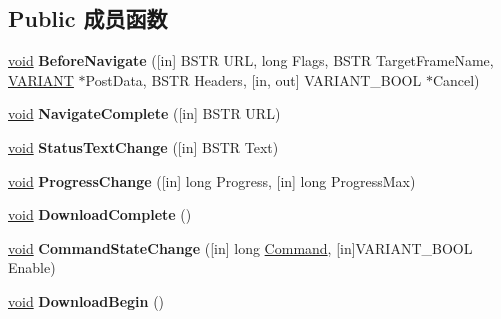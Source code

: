 \subsection*{Public 成员函数}
\begin{DoxyCompactItemize}
\item 
\mbox{\label{interface_s_h_doc_vw_1_1uuid_a81933cddb64bffcead5b3bffbcf7a5f6}} 
\hyperlink{interfacevoid}{void} {\bfseries Before\+Navigate} (\mbox{[}in\mbox{]} B\+S\+TR U\+RL, long Flags, B\+S\+TR Target\+Frame\+Name, \hyperlink{structtag_v_a_r_i_a_n_t}{V\+A\+R\+I\+A\+NT} $\ast$Post\+Data, B\+S\+TR Headers, \mbox{[}in, out\mbox{]} V\+A\+R\+I\+A\+N\+T\+\_\+\+B\+O\+OL $\ast$Cancel)
\item 
\mbox{\label{interface_s_h_doc_vw_1_1uuid_a240089bb39c9bac689dd4fed378fa785}} 
\hyperlink{interfacevoid}{void} {\bfseries Navigate\+Complete} (\mbox{[}in\mbox{]} B\+S\+TR U\+RL)
\item 
\mbox{\label{interface_s_h_doc_vw_1_1uuid_a576a847c0ad64a05dbabb6d517f5ecee}} 
\hyperlink{interfacevoid}{void} {\bfseries Status\+Text\+Change} (\mbox{[}in\mbox{]} B\+S\+TR Text)
\item 
\mbox{\label{interface_s_h_doc_vw_1_1uuid_ad0a4046c6922c56b1b726e301d474086}} 
\hyperlink{interfacevoid}{void} {\bfseries Progress\+Change} (\mbox{[}in\mbox{]} long Progress, \mbox{[}in\mbox{]} long Progress\+Max)
\item 
\mbox{\label{interface_s_h_doc_vw_1_1uuid_a0815fd0342635c884b6adf3c3af778ac}} 
\hyperlink{interfacevoid}{void} {\bfseries Download\+Complete} ()
\item 
\mbox{\label{interface_s_h_doc_vw_1_1uuid_adc74e6a1d4edcdcb44ff0ffd72529968}} 
\hyperlink{interfacevoid}{void} {\bfseries Command\+State\+Change} (\mbox{[}in\mbox{]} long \hyperlink{struct_command}{Command}, \mbox{[}in\mbox{]}V\+A\+R\+I\+A\+N\+T\+\_\+\+B\+O\+OL Enable)
\item 
\mbox{\label{interface_s_h_doc_vw_1_1uuid_a0ec27f27fd5ac9f175f0eaa5b7089088}} 
\hyperlink{interfacevoid}{void} {\bfseries Download\+Begin} ()

\end{DoxyCompactItemize}
